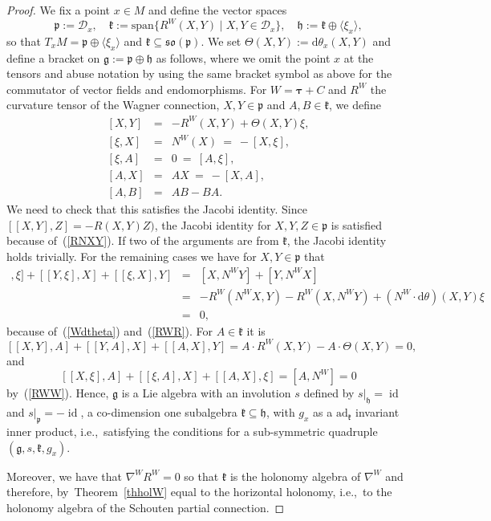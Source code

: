 \documentclass{amsart}
\theoremstyle{plain}
\theoremstyle{definition}
\newcommand{\id}{\operatorname{id}}
\def\so{\mathfrak{so}}
\newcommand{\h}{\mathfrak{h}}
\newcommand{\bt}{{\boldsymbol{\tau}}}
\newcommand{\1}{\mathbf{1}}
\newcommand{\ad}{\mathrm{ad}}
\newcommand{\p}{\mathfrak{p}}
\renewcommand{\k}{\mathfrak{k}}
\newcommand{\g}{\mathfrak{g}}
\newcommand{\D}{{\mathcal D}}
\renewcommand{\d}{\mathrm{d}}
\newcommand{\+}{\oplus}
\newcommand{\acom}[1]{
 \marginpar{{\scriptsize A: #1 }}}
\begin{document}
\begin{proof}
We fix a point $x\in M$  and define the vector spaces
\[ \p:=\D_x,\quad \k:=\mathrm{span}\{R^W(X,Y)\mid X,Y \in \D_x\},\quad \h:=\k\+\langle \xi_x\rangle,\]
so that $T_xM=\p\+\langle \xi_x\rangle$ and $\k\subseteq \so(\p)$.
We set  $\Theta (X,Y):=\d\theta_x(X,Y)$
and
define a  bracket on $\g:=\p\+\h$ as follows, where we omit the point $x$ at the tensors and abuse notation by using the same bracket symbol as above for the commutator of vector fields and  endomorphisms. For $W=\bt+C$ and $R^W$ the curvature tensor of the Wagner connection, $X,Y\in \p$ and $A,B\in \k$, we define
\begin{equation}\label{Liebracket}
\begin{array}{rcl}
\left[X,Y\right]&=& -R^W(X,Y)+\Theta (X,Y)\xi,
\\
\left[\xi,X\right]&=&N^W(X)\ =\ -\left[X,\xi\right],
\\
\left[\xi,A\right]&=&0\ =\ [A,\xi ], 
\\
\left[A,X\right]&=& AX\ =\ - [X,A],
\\
\left[A,B\right]&=& AB-BA.
\end{array}
\end{equation}
We need to check that this satisfies the Jacobi identity. 
Since   $[[X,Y],Z]=-R(X,Y)Z)$,  the Jacobi identity for $X,Y,Z\in \p$ is satisfied  because of~(\ref{RNXY}). If two of the arguments are from $\k$, the Jacobi identity holds  trivially. 
For the remaining cases we have for $X,Y\in \p$ that
\begin{eqnarray*}
[[X,Y],\xi]+[[Y,\xi],X]+[[\xi,X],Y]
&=&
[X,N^WY]+[Y,N^WX]
\\
&=&-R^W(N^WX,Y)-R^W(X,N^WY) +(N^W\cdot \d\theta)(X,Y)\xi
\\
&=&
0,
\end{eqnarray*}
because of~(\ref{Wdtheta}) and~(\ref{RWR}).
For 
$A\in \k$ it is
\[
[[X,Y],A]+[[Y,A],X]+[[A,X],Y]
=
A\cdot R^W(X,Y)-A\cdot \Theta (X,Y)
=
0,
\]
and 
\[
[[X,\xi],A]+[[\xi,A],X]+[[A,X],\xi]
=
[A,N^W]
=
0
\]
by~(\ref{RWW}).
Hence, $\g$ is a Lie algebra with an involution $s$ defined by $s|_\h=\id$ and $s|_\p=-\id$, a co-dimension one subalgebra $\k\subseteq \h$, with $g_x$ as a $\ad_\k$ invariant inner product, i.e.,~satisfying the conditions for a sub-symmetric quadruple $(\g,s,\k,g_x)$. 

Moreover, we have that $\nabla^WR^W=0$ so that $\k$ is the holonomy algebra of $\nabla^W$ and therefore, by~Theorem~\ref{thholW} equal to the horizontal holonomy, i.e.,~to the holonomy algebra of the Schouten partial connection.



\end{proof}
\end{document}
